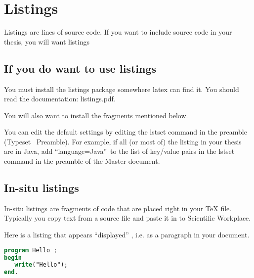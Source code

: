 \section{Listings}

Listings are lines of source code. If you want to include source code in
your thesis, you will want listings

\subsection{If you do want to use listings\label{sec:doWantListings}}

You must install the listings package somewhere latex can find it. You
should read the documentation: listings.pdf.

You will also want to install the fragments mentioned below.

You can edit the default settings by editing the \TEXTsymbol{\backslash}%
lstset command in the preamble (Typeset \TEXTsymbol{>}\TEXTsymbol{>}\
Preamble). For example, if all (or most of) the listing in your thesis are
in Java, add \textquotedblleft language=Java\textquotedblright\ to the list
of key/value pairs in the \TEXTsymbol{\backslash}lstset command in the
preamble of the Master document.

\subsection{In-situ listings}

In-situ listings are fragments of code that are placed right in your TeX
file. Typically you copy text from a source file and paste it in to
Scientific Workplace.

Here is a listing that appears \textquotedblleft displayed\textquotedblright
, i.e. as a paragraph in your document.

\begin{singlespaced}%

\begin{lstlisting}[language=Pascal]
program Hello ;
begin
   write("Hello");
end.
\end{lstlisting}%

\end{singlespaced}%

